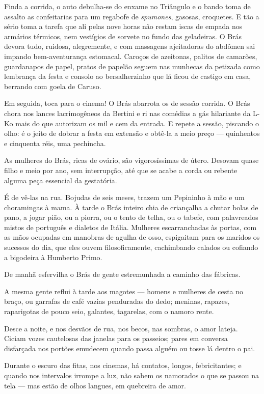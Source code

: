 Finda a corrida, o auto debulha-se do enxame no Triângulo e o bando toma
de assalto as confeitarias para um regabofe de \emph{spumones}, gasosas,
croquetes. E tão a sério toma a tarefa que ali pelas nove horas não
restam iscas de empada nos armários térmicos, nem vestígios de sorvete
no fundo das geladeiras. O Brás devora tudo, ruidosa, alegremente, e com
massagens ajeitadoras do abdômen sai impando bem-aventurança estomacal.
Caroços de azeitonas, palitos de camarões, guardanapos de papel, pratos
de papelão seguem nas munhecas da petizada como lembrança da festa e
consolo ao bersalherzinho que lá ficou de castigo em casa, berrando com
goela de Caruso.

Em seguida, toca para o cinema! O Brás abarrota os de sessão corrida. O
Brás chora nos lances lacrimogêneos da Bertini e ri nas comédias a gás
hilariante da L-Ko mais do que autorizam os mil e cem da entrada. E
repete a sessão, piscando o olho: é o jeito de dobrar a festa em
extensão e obtê-la a meio preço --- quinhentos e cinquenta réis, uma
pechincha.

As mulheres do Brás, ricas de ovário, são vigorosíssimas de útero.
Desovam quase filho e meio por ano, sem interrupção, até que se acabe a
corda ou rebente alguma peça essencial da gestatória.

É de vê-las na rua. Bojudas de seis meses, trazem um Pepininho à mão e
um choramingas à mama. À tarde o Brás inteiro chia de criançalha a
chutar bolas de pano, a jogar pião, ou a piorra, ou o tento de telha, ou
o tabefe, com palavreados mistos de português e dialetos de Itália.
Mulheres escarranchadas às portas, com as mãos ocupadas em manobras de
agulha de osso, espigaitam para os maridos os sucessos do dia, que eles
ouvem filosoficamente, cachimbando calados ou cofiando a bigodeira à
Humberto Primo.

De manhã esfervilha o Brás de gente estremunhada a caminho das fábricas.

A mesma gente reflui à tarde aos magotes --- homens e mulheres de cesta
no braço, ou garrafas de café vazias penduradas do dedo; meninas,
rapazes, raparigotas de pouco seio, galantes, tagarelas, com o namoro
rente.

Desce a noite, e nos desvãos de rua, nos becos, nas sombras, o amor
lateja. Ciciam vozes cautelosas das janelas para os passeios; pares em
conversa disfarçada nos portões emudecem quando passa alguém ou tosse lá
dentro o pai.

Durante o escuro das fitas, nos cinemas, há contatos, longos,
febricitantes; e quando nos intervalos irrompe a luz, não sabem os
namorados o que se passou na tela --- mas estão de olhos langues, em
quebreira de amor.

